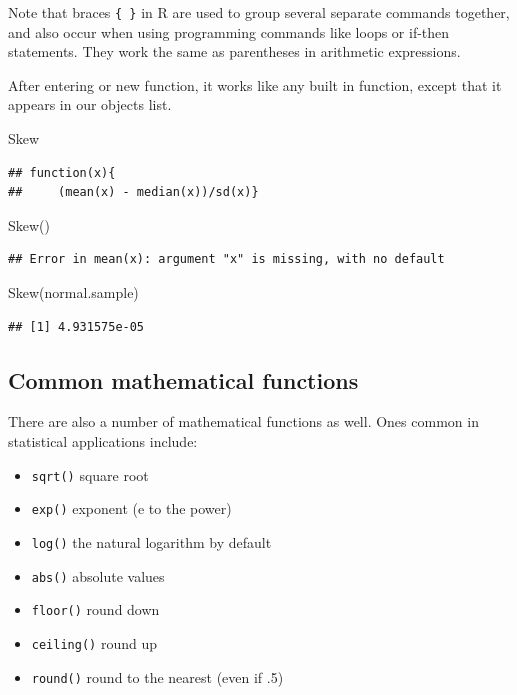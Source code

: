 \documentclass[
]{book}
\newenvironment{Shaded}{\begin{snugshade}}{\end{snugshade}}
\newcommand{\FunctionTok}[1]{\textcolor[rgb]{0.00,0.00,0.00}{#1}}
\newcommand{\NormalTok}[1]{#1}
\providecommand{\tightlist}{%
  \setlength{\itemsep}{0pt}\setlength{\parskip}{0pt}}
\begin{document}
Note that braces \texttt{\{\ \}} in R are used to group several separate commands together, and also occur when using programming commands like loops or if-then statements. They work the same as parentheses in arithmetic expressions.

After entering or new function, it works like any built in function, except that it appears in our objects list.

\begin{Shaded}
\begin{Highlighting}[]
\NormalTok{Skew}
\end{Highlighting}
\end{Shaded}

\begin{verbatim}
## function(x){
##     (mean(x) - median(x))/sd(x)}
\end{verbatim}

\begin{Shaded}
\begin{Highlighting}[]
\FunctionTok{Skew}\NormalTok{()}
\end{Highlighting}
\end{Shaded}

\begin{verbatim}
## Error in mean(x): argument "x" is missing, with no default
\end{verbatim}

\begin{Shaded}
\begin{Highlighting}[]
\FunctionTok{Skew}\NormalTok{(normal.sample)}
\end{Highlighting}
\end{Shaded}

\begin{verbatim}
## [1] 4.931575e-05
\end{verbatim}

\hypertarget{common-mathematical-functions}{%
\subsection*{Common mathematical functions}\label{common-mathematical-functions}}

There are also a number of mathematical functions as well. Ones common in statistical applications include:

\begin{itemize}
\tightlist
\item
  \texttt{sqrt()} square root
\item
  \texttt{exp()} exponent (e to the power)
\item
  \texttt{log()} the natural logarithm by default
\item
  \texttt{abs()} absolute values
\item
  \texttt{floor()} round down
\item
  \texttt{ceiling()} round up
\item
  \texttt{round()} round to the nearest (even if .5)
\end{itemize}
\end{document}
